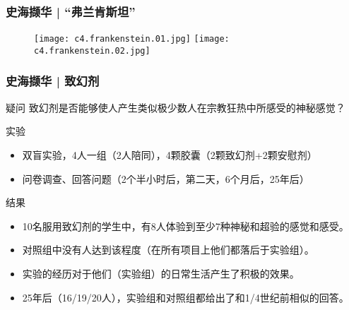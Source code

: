 \begin{frame}
  \frametitle{史海撷华 | “弗兰肯斯坦”}
  \begin{figure}
    \centering
    \texttt{[image: c4.frankenstein.01.jpg]}\quad
    \texttt{[image: c4.frankenstein.02.jpg]}
  \end{figure}
\end{frame}

% 
\begin{frame}
  \frametitle{史海撷华 | 致幻剂}
  \vspace{-0.5em}
  \begin{block}{疑问}
    致幻剂是否能够使人产生类似极少数人在宗教狂热中所感受的神秘感觉？
  \end{block}
  \vspace{-0.5em}
  \pause
  \begin{block}{实验}
    \begin{itemize}
      \item 双盲实验，4人一组（2人陪同），4颗胶囊（2颗致幻剂+2颗安慰剂）
      \item 问卷调查、回答问题（2个半小时后，第二天，6个月后，25年后）
    \end{itemize}
  \end{block}
  \vspace{-0.5em}
  \pause
  \begin{block}{结果}
    \begin{itemize}
      \item 10名服用致幻剂的学生中，有8人体验到至少7种神秘和超验的感觉和感受。
      \item 对照组中没有人达到该程度（在所有项目上他们都落后于实验组）。
      \item 实验的经历对于他们（实验组）的日常生活产生了积极的效果。
      \item 25年后（16/19/20人），实验组和对照组都给出了和1/4世纪前相似的回答。
    \end{itemize}
  \end{block}
\end{frame}

